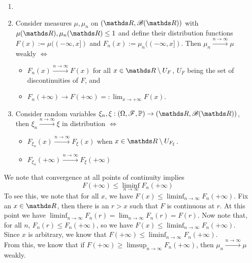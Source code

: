 \begin{theorem} \label{thm:conv_in_dist_func}
\begin{enumerate}
\item[]
\item Consider measures $\mu, \mu_n$ on $(\R,\B(\R))$ with $\mu(\R), \mu_n(\R) \leq 1$ and define their distribution functions $F(x) := \mu((-\infty,x])$ and $F_n(x) := \mu_n((-\infty, x])$. Then $\mu_n \overset{n\to\infty}{\to} \mu$ weakly $\iff$ 
\begin{itemize}
\item $F_n(x) \overset{n\to\infty}\to F(x)$ for all $x \in \R \setminus U_F$, $U_F$ being the set of discontinuities of $F$, and 
\item $F_n(+\infty) \to F(+\infty) =: \lim_{x\to +\infty} F(x)$. 
\end{itemize}

\item Consider random variables $\xi_n, \xi : (\Omega,\F,\p) \to (\R,\B(\R))$, then $\xi_n \overset{n\to\infty}{\to} \xi$ in distribution $\iff$ 
\begin{itemize}
\item $F_{\xi_n}(x) \overset{n\to\infty}{\to} F_\xi(x)$ when $x \in \R \setminus U_{F_\xi}$.
\item $F_{\xi_n}(+\infty) \overset{n\to\infty}{\to} F_\xi(+\infty)$
\end{itemize}
\end{enumerate}
\end{theorem}

\begin{remark} \label{rmk:weakening_conv_in_dist}
We note that convergence at all points of continuity implies 
\begin{equation}
F(+\infty) \leq \liminf_{n\to\infty} F_{n}(+\infty)
\end{equation}
To see this, we note that for all $x$, we have $F(x) \leq \liminf_{n\to\infty} F_n(+\infty)$. Fix an $x \in \R$, then there is an $r > x$ such that $F$ is continuous at $r$. At this point we have $\liminf_{n\to\infty} F_n(r) = \lim_{n\to\infty} F_n(r) = F(r)$. Now note that, for all $n$, $F_n(r) \leq F_n(+\infty)$, so we have $F(x) \leq \liminf_{n\to\infty} F_{n}(+\infty)$. Since $x$ is arbitrary, we know that $F(+\infty) \leq \liminf_{n\to\infty} F_{n}(+\infty)$.\\

From this, we know that if $F(+\infty) \geq \limsup_{n\to\infty} F_n(+\infty)$, then $\mu_n \overset{n\to\infty}{\to} \mu$ weakly.
\end{remark}

